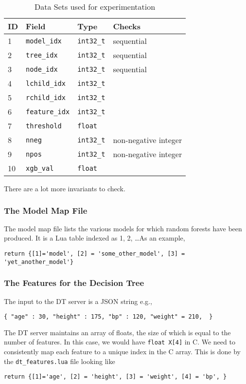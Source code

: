 \begin{table}
\centering
\begin{tabular}{|l|l|l|l|} \hline \hline
{\bf ID} & {\bf Field } & {\bf Type} & {\bf Checks} \\ \hline
1 & \verb+model_idx+ & \verb+int32_t+ & sequential \\ \hline
2 & \verb+tree_idx+  & \verb+int32_t+ & sequential \\ \hline
3 & \verb+node_idx+  & \verb+int32_t+ & sequential \\ \hline
4 & \verb+lchild_idx+  & \verb+int32_t+ & \\ \hline
5 & \verb+rchild_idx+  & \verb+int32_t+ & \\ \hline
6 & \verb+feature_idx+  & \verb+int32_t+ & \\ \hline
7 & \verb+threshold+  & \verb+float+ \\ \hline
8 & \verb+nneg+  & \verb+int32_t+ & non-negative integer\\ \hline
9 & \verb+npos+  & \verb+int32_t+ & non-negative integer\\ \hline
10 & \verb+xgb_val+  & \verb+float+ & \\ \hline
\end{tabular}
\label{tbl_data_sets}
\caption{Data Sets used for experimentation}
\end{table}

There are a lot more invariants to check. \TBC

\subsubsection{The Model Map File}
\label{mdl_map}
The model map file lists the various models for which random forests 
have been produced. It is a Lua table indexed as 1, 2, \ldots As an example,
\begin{verbatim}
return {[1]='model', [2] = 'some_other_model', [3] = 'yet_another_model'}
\end{verbatim}

\subsubsection{The Features for the Decision Tree}
\label{dt_features}

The input to the DT server is a JSON string e.g.,
\begin{verbatim}
{ "age" : 30, "height" : 175, "bp" : 120, "weight" = 210,  }
\end{verbatim}
The DT server maintains an array of floats, the size of which is equal to the
number of features. In this case, we would have \verb+float X[4]+ in C.
We need to consistently map each feature to a unique index in the C array. This is done
by the \verb+dt_features.lua+ file looking like 
\begin{verbatim}
return {[1]='age', [2] = 'height', [3] = 'weight', [4] = 'bp', }
\end{verbatim}

